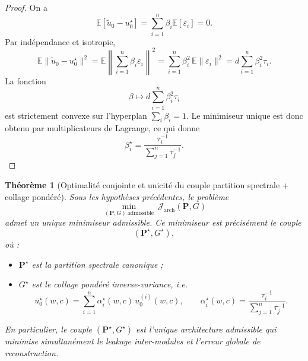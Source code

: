 \documentclass[11pt,a4paper]{article}
\newtheorem{theorem}{Théorème}[section]
\newcommand{\1}{\mathbf 1}
\begin{document}
\begin{proof}
On a
\[
\mathbb E[\tilde u_0-u_0^\star]
=
\sum_{i=1}^n \beta_i\mathbb E[\varepsilon_i]
=
0.
\]
Par indépendance et isotropie,
\[
\mathbb E\|\tilde u_0-u_0^\star\|^2
=
\mathbb E\left\|\sum_{i=1}^n\beta_i\varepsilon_i\right\|^2
=
\sum_{i=1}^n\beta_i^2\,\mathbb E\|\varepsilon_i\|^2
=
d\sum_{i=1}^n\beta_i^2\tau_i.
\]
La fonction
\[
\beta\mapsto d\sum_{i=1}^n\beta_i^2\tau_i
\]
est strictement convexe sur l'hyperplan \(\sum_i\beta_i=1\).  
Le minimiseur unique est donc obtenu par multiplicateurs de Lagrange, ce qui donne
\[
\beta_i^\star
=
\frac{\tau_i^{-1}}{\sum_{j=1}^n\tau_j^{-1}}.
\]
\end{proof}

\begin{theorem}[Optimalité conjointe et unicité du couple partition spectrale + collage pondéré]
Sous les hypothèses précédentes, le problème
\[
\min_{(\mathbf P,G)\ \mathrm{admissible}} \ \mathcal J_{\mathrm{arch}}(\mathbf P,G)
\]
admet un unique minimiseur admissible.
Ce minimiseur est précisément le couple
\[
(\mathbf P^\star,G^\star),
\]
où :

\begin{itemize}[leftmargin=2em]
    \item \(\mathbf P^\star\) est la partition spectrale canonique ;
    \item \(G^\star\) est le collage pondéré inverse-variance, i.e.
    \[
    \bar u_0^\star(w,c)
    =
    \sum_{i=1}^n \alpha_i^\star(w,c)\,u_0^{(i)}(w,c),
    \qquad
    \alpha_i^\star(w,c)
    =
    \frac{\tau_i^{-1}}{\sum_{j=1}^n \tau_j^{-1}}.
    \]
\end{itemize}

En particulier, le couple \((\mathbf P^\star,G^\star)\) est l'unique architecture admissible qui minimise simultanément le leakage inter-modules et l'erreur globale de reconstruction.
\end{theorem}
\end{document}
